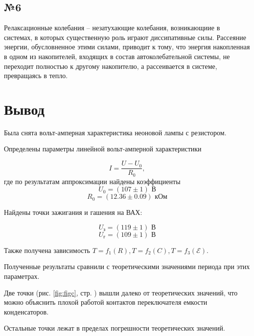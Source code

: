 \subsection{№6}

Релаксационные колебания -- незатухающие колебания, возникающиие в системах, в которых существенную роль играют диссипативные силы. Рассеяние энергии, обусловненное этими силами, приводит к тому, что энергия  накопленная в одном из накопителей, входящих в состав автоколебательной системы, не переходит полностью к другому накопителю, а рассеивается в системе, превращаясь в тепло.


\newpage
\section{Вывод}

Была снята вольт-амперная характеристика неоновой лампы с резистором. 

Определены параметры линейной вольт-амперной характеристики 

\begin{equation}
	I=\frac{U-U_0}{R_0},
\end{equation}
где по результатам аппроксимации найдены коэффициенты 
\begin{equation}
	U_0=(107\pm1) \text{ В}
\end{equation}
\begin{equation}
	R_0=(12.36\pm0.09) \text{ кОм}
\end{equation}

Найдены точки зажигания и гашения на ВАХ:

\begin{equation}
	U_\text{з}=(119\pm1) \text{ В}
\end{equation}
\begin{equation}
	U_\text{г}=(109\pm1) \text{ В}
\end{equation}




Также получена зависимость $T=f_1(R)$,\,$T=f_2(C)$,\,$T=f_3(\mathcal{E})$. 

Полученные результаты сравнили с теоретическими значениями периода при этих параметрах. 

Две точки (рис. \ref{fig:figc}, стр. \pageref{fig:figc}) вышли далеко от теоретических значений, что можно объяснить плохой работой контактов переключателя емкости конденсаторов.

Остальные точки лежат в пределах погрешности теоретических значений.

